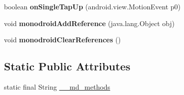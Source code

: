 \begin{DoxyCompactItemize}
boolean {\bfseries on\+Single\+Tap\+Up} (android.\+view.\+Motion\+Event p0)
\item 
\mbox{\label{classmd5b60ffeb829f638581ab2bb9b1a7f4f3f_1_1ViewCellRenderer__ViewCellContainer__LongPressGestureListener_a65ab3a27390016d9f425a42956aadf67}} 
void {\bfseries monodroid\+Add\+Reference} (java.\+lang.\+Object obj)
\item 
\mbox{\label{classmd5b60ffeb829f638581ab2bb9b1a7f4f3f_1_1ViewCellRenderer__ViewCellContainer__LongPressGestureListener_a6663baea3c09894d07cad3f947120111}} 
void {\bfseries monodroid\+Clear\+References} ()
\end{DoxyCompactItemize}
\subsection*{Static Public Attributes}
\begin{DoxyCompactItemize}
\item 
static final String \hyperlink{classmd5b60ffeb829f638581ab2bb9b1a7f4f3f_1_1ViewCellRenderer__ViewCellContainer__LongPressGestureListener_a1ca45b506417154ae7b4956694d189a9}{\+\_\+\+\_\+md\+\_\+methods}
\end{DoxyCompactItemize}
